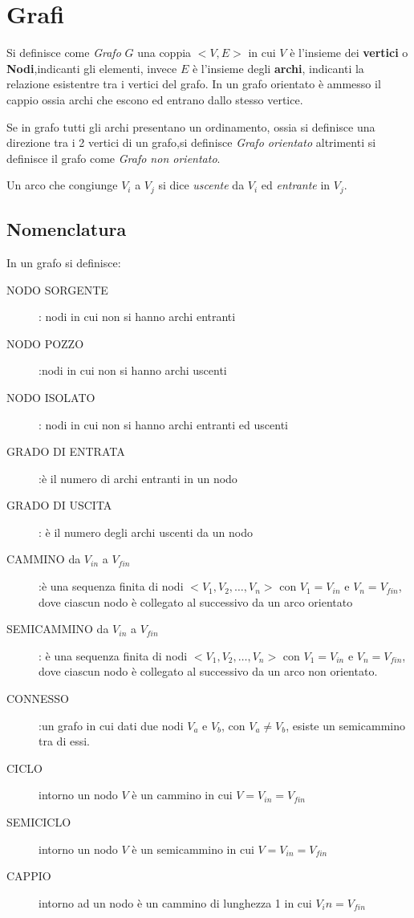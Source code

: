 \section{Grafi}
Si definisce come \emph{Grafo} $G$ una coppia $<V,E>$ in cui $V$ è l'insieme
dei \textbf{vertici} o \textbf{Nodi},indicanti gli elementi, invece $E$
 è l'insieme degli \textbf{archi}, indicanti la relazione esistentre tra i vertici del grafo.\newline
In un grafo orientato è ammesso il cappio ossia archi che escono ed entrano dallo stesso vertice.

Se in grafo tutti gli archi presentano un ordinamento, ossia si definisce una direzione
tra i 2 vertici di un grafo,si definisce \emph{Grafo orientato}
altrimenti si definisce il grafo come \emph{Grafo non orientato}.

Un arco che congiunge $V_i$ a $V_j$ si dice \emph{uscente} da $V_i$ ed \emph{entrante} in $V_j$.

\subsection{Nomenclatura}
In un grafo si definisce:
\begin{description}
    \item[NODO SORGENTE]: nodi in cui non si hanno archi entranti
    \item[NODO POZZO]:nodi in cui non si hanno archi uscenti
    \item[NODO ISOLATO]: nodi in cui non si hanno archi entranti ed uscenti
    \item[GRADO DI ENTRATA]:è il numero di archi entranti in un nodo
    \item[GRADO DI USCITA]: è il numero degli archi uscenti da un nodo
    \item[CAMMINO da $V_{in}$ a $V_{fin}$]:è una sequenza finita di nodi $<V_1,V_2,\dots,V_n>$
     con $V_1 = V_{in}$ e $V_n = V_{fin}$, dove ciascun nodo è collegato al successivo da un arco orientato
    \item[SEMICAMMINO da $V_{in}$ a $V_{fin}$]: è una sequenza finita di nodi
     $<V_1,V_2,\dots,V_n>$ con $V_1 = V_{in}$ e $V_n = V_{fin}$, dove ciascun nodo
     è collegato al successivo da un arco non orientato.
    \item[CONNESSO]:un grafo in cui dati due nodi $V_a$ e $V_b$, con $V_a \neq V_b$,
                    esiste un semicammino tra di essi.
    \item[CICLO]intorno un nodo $V$ è un cammino in cui $V = V_{in} = V_{fin}$
    \item[SEMICICLO]intorno un nodo $V$ è un semicammino in cui $V = V_{in} = V_{fin}$
    \item[CAPPIO]intorno ad un nodo è un cammino di lunghezza 1 in cui $V_in = V_{fin}$
\end{description}

